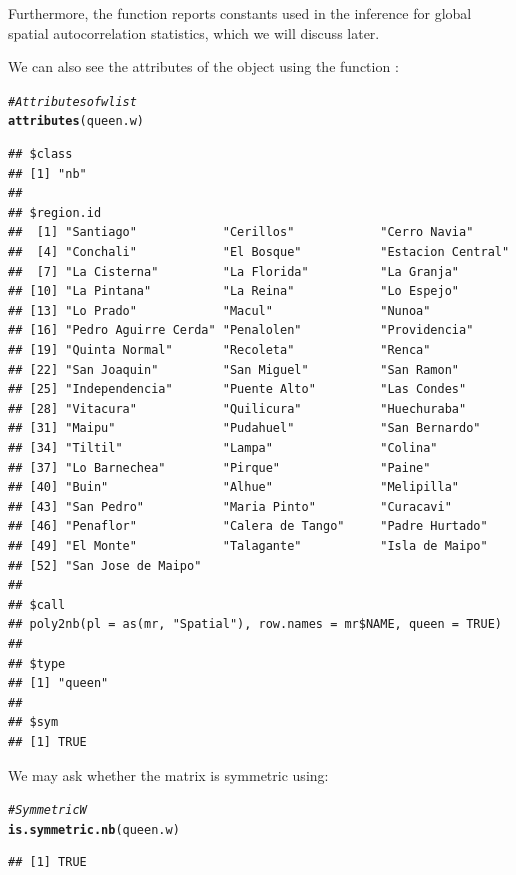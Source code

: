 \documentclass[english,12pt]{book}\usepackage[]{graphicx}\usepackage[]{xcolor}
\makeatletter
\newcommand{\hlcom}[1]{\textcolor[rgb]{0.678,0.584,0.686}{\textit{#1}}}%
\newcommand{\hlstd}[1]{\textcolor[rgb]{0.345,0.345,0.345}{#1}}%
\newcommand{\hlkwd}[1]{\textcolor[rgb]{0.737,0.353,0.396}{\textbf{#1}}}%
\newenvironment{kframe}{%
 \def\at@end@of@kframe{}%
 \ifinner\ifhmode%
  \def\at@end@of@kframe{\end{minipage}}%
  \begin{minipage}{\columnwidth}%
 \fi\fi%
 \def\FrameCommand##1{\hskip\@totalleftmargin \hskip-\fboxsep
 \colorbox{shadecolor}{##1}\hskip-\fboxsep
     \hskip-\linewidth \hskip-\@totalleftmargin \hskip\columnwidth}%
 \MakeFramed {\advance\hsize-\width
   \@totalleftmargin\z@ \linewidth\hsize
   \@setminipage}}%
 {\par\unskip\endMakeFramed%
 \at@end@of@kframe}
\newenvironment{knitrout}{}{} %
\makeatother
\begin{document}
Furthermore, the  function reports constants used in the inference for global spatial autocorrelation statistics, which we will discuss later. 

We can also see the attributes of the object using the function :


\begin{knitrout}
\color{fgcolor}\begin{kframe}
\begin{alltt}
\hlcom{# Attributes of wlist}
\hlkwd{attributes}\hlstd{(queen.w)}
\end{alltt}
\begin{verbatim}
## $class
## [1] "nb"
## 
## $region.id
##  [1] "Santiago"            "Cerillos"            "Cerro Navia"        
##  [4] "Conchali"            "El Bosque"           "Estacion Central"   
##  [7] "La Cisterna"         "La Florida"          "La Granja"          
## [10] "La Pintana"          "La Reina"            "Lo Espejo"          
## [13] "Lo Prado"            "Macul"               "Nunoa"              
## [16] "Pedro Aguirre Cerda" "Penalolen"           "Providencia"        
## [19] "Quinta Normal"       "Recoleta"            "Renca"              
## [22] "San Joaquin"         "San Miguel"          "San Ramon"          
## [25] "Independencia"       "Puente Alto"         "Las Condes"         
## [28] "Vitacura"            "Quilicura"           "Huechuraba"         
## [31] "Maipu"               "Pudahuel"            "San Bernardo"       
## [34] "Tiltil"              "Lampa"               "Colina"             
## [37] "Lo Barnechea"        "Pirque"              "Paine"              
## [40] "Buin"                "Alhue"               "Melipilla"          
## [43] "San Pedro"           "Maria Pinto"         "Curacavi"           
## [46] "Penaflor"            "Calera de Tango"     "Padre Hurtado"      
## [49] "El Monte"            "Talagante"           "Isla de Maipo"      
## [52] "San Jose de Maipo"  
## 
## $call
## poly2nb(pl = as(mr, "Spatial"), row.names = mr$NAME, queen = TRUE)
## 
## $type
## [1] "queen"
## 
## $sym
## [1] TRUE
\end{verbatim}
\end{kframe}
\end{knitrout}

We may ask whether the matrix is symmetric using:

\begin{knitrout}
\color{fgcolor}\begin{kframe}
\begin{alltt}
\hlcom{# Symmetric W}
\hlkwd{is.symmetric.nb}\hlstd{(queen.w)}
\end{alltt}
\begin{verbatim}
## [1] TRUE
\end{verbatim}
\end{kframe}
\end{knitrout}
\end{document}
